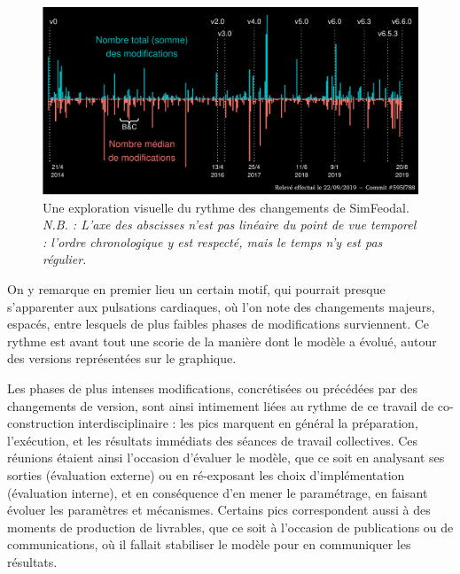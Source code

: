 
\begin{figure}[H]
	\includegraphics[width=1\linewidth]{img/explo_edits_code_clean.pdf}
	\caption[Une exploration visuelle du rythme des changements de SimFeodal.]{Une exploration visuelle du rythme des changements de SimFeodal.\\
		\textit{N.B. : L'axe des abscisses n'est pas linéaire du point de vue temporel : l'ordre chronologique y est respecté, mais le temps n'y est pas régulier.}
	}
	\label{fig:explo-edits-code}
\end{figure}

On y remarque en premier lieu un certain motif, qui pourrait presque s'apparenter aux pulsations cardiaques, où l'on note des changements majeurs, espacés, entre lesquels de plus faibles phases de modifications surviennent.
Ce \og rythme\fg{} est avant tout une scorie de la manière dont le modèle a évolué, autour des versions représentées sur le graphique.

Les phases de plus intenses modifications, concrétisées ou précédées par des changements de version, sont ainsi intimement liées au rythme de ce travail de co-construction interdisciplinaire : les pics marquent en général la préparation, l'exécution, et les résultats immédiats des séances de travail collectives.
Ces réunions étaient ainsi l'occasion d'évaluer le modèle, que ce soit en analysant ses sorties (évaluation externe) ou en ré-exposant les choix d'implémentation (évaluation interne), et en conséquence d'en mener le paramétrage, en faisant évoluer les paramètres et mécanismes.
Certains pics correspondent aussi à des moments de production de \og livrables\fg{}, que ce soit à l'occasion de publications ou de communications, où il fallait stabiliser le modèle pour en communiquer les résultats.

